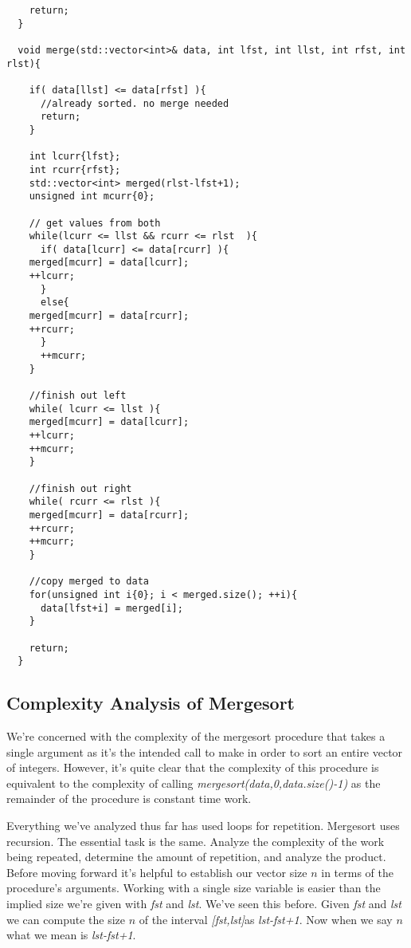 \documentclass[]{tufte-handout}
\begin{document}
\begin{verbatim}
    return;
  }

  void merge(std::vector<int>& data, int lfst, int llst, int rfst, int rlst){

    if( data[llst] <= data[rfst] ){
      //already sorted. no merge needed
      return;
    }

    int lcurr{lfst};
    int rcurr{rfst};
    std::vector<int> merged(rlst-lfst+1);
    unsigned int mcurr{0};

    // get values from both
    while(lcurr <= llst && rcurr <= rlst  ){
      if( data[lcurr] <= data[rcurr] ){
	merged[mcurr] = data[lcurr];
	++lcurr;
      }
      else{
	merged[mcurr] = data[rcurr];
	++rcurr;
      }
      ++mcurr;
    }

    //finish out left
    while( lcurr <= llst ){
	merged[mcurr] = data[lcurr];
	++lcurr;
	++mcurr;
    }

    //finish out right
    while( rcurr <= rlst ){
	merged[mcurr] = data[rcurr];
	++rcurr;
	++mcurr;
    }

    //copy merged to data
    for(unsigned int i{0}; i < merged.size(); ++i){
      data[lfst+i] = merged[i];
    }
    
    return;
  }

\end{verbatim}


\subsection{Complexity Analysis of Mergesort}

We're concerned with the complexity of the mergesort procedure that takes a single argument as it's the intended call to make in order to sort an entire vector of integers. However, it's quite clear that the complexity of this procedure is equivalent to the complexity of calling \textit{mergesort(data,0,data.size()-1)} as the remainder of the procedure is constant time work. 

Everything we've analyzed thus far has used loops for repetition. Mergesort uses recursion. The essential task is the same. Analyze the complexity of the work being repeated, determine the amount of repetition, and analyze the product.  Before moving forward it's helpful to establish our vector size $n$ in terms of the procedure's arguments. Working with a single size variable is easier than the implied size we're given with \textit{fst} and \textit{lst}. We've seen this before. Given \textit{fst} and \textit{lst} we can compute the size $n$ of the interval \textit{[fst,lst]}as \textit{lst-fst+1}. Now when we say $n$ what we mean is \textit{lst-fst+1}.  
\end{document}
